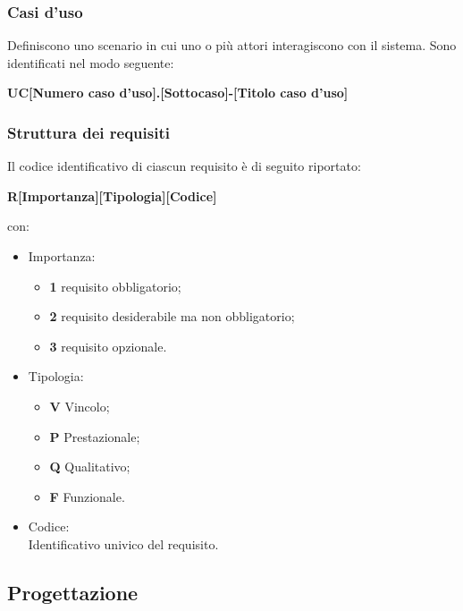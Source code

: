    \subsubsection{Casi d'uso}
    Definiscono uno scenario in cui uno o più attori interagiscono con il sistema. Sono identificati nel modo seguente:
    \begin{center}
      \textbf{UC[Numero caso d'uso].[Sottocaso]-[Titolo caso d'uso]}\\
    \end{center}
    \subsubsection{Struttura dei requisiti}
      Il codice identificativo di ciascun requisito è di seguito riportato:
      \begin{center}
        \textbf{R[Importanza][Tipologia][Codice]}\\
      \end{center}
      con:
      \begin{itemize}
        \item Importanza:
        \begin{itemize}
          \item \textbf{1} requisito obbligatorio;
          \item \textbf{2} requisito desiderabile ma non obbligatorio;
          \item \textbf{3} requisito opzionale.
        \end{itemize}

        \item Tipologia:
        \begin{itemize}
          \item \textbf{V} Vincolo;
          \item \textbf{P} Prestazionale;
          \item \textbf{Q} Qualitativo;
          \item \textbf{F} Funzionale.
        \end{itemize}

        \item Codice:\\
        Identificativo univico del requisito.
      \end{itemize}

  \subsection{Progettazione}
